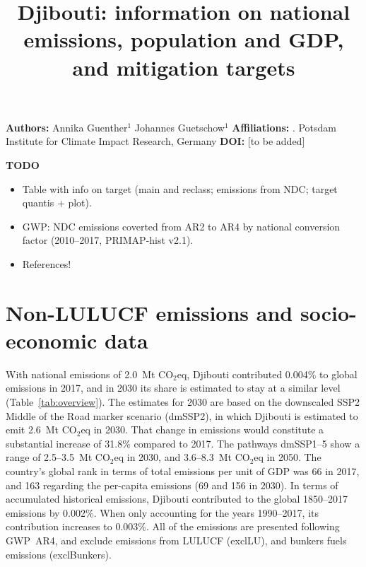 \documentclass[12pt]{article}
\title{ \bfseries \color{PIKorange} Djibouti: information on national emissions, population and GDP, and mitigation targets}
\begin{document}
 \maketitle

 \noindent \textbf{Authors:} \newline
 \indent Annika Guenther$^{1}$ \newline
 \indent Johannes Guetschow$^{1}$ \newline
 \noindent \textbf{Affiliations:} \newline
 . Potsdam Institute for Climate Impact Research, Germany \newline
 \noindent \textbf{DOI:} [to be added] \newline

 \textbf{TODO}
 \begin{itemize}
 \item Table with info on target (main and reclass; emissions from NDC; target quantis + plot).
 \item GWP: NDC emissions coverted from AR2 to AR4 by national conversion factor (2010--2017, PRIMAP-hist v2.1).
 \item References!
 \end{itemize}

 \newpage %
 \section{Non-LULUCF emissions and socio-economic data}
 \label{sec:nonLULUCFSocioEco}
 With national emissions of 2.0~Mt CO$_2$eq, Djibouti contributed 0.004\% to global emissions in 2017, and in 2030 its share is estimated to stay at a similar level (Table~\ref{tab:overview}).
 The estimates for 2030 are based on the downscaled SSP2 Middle of the Road marker scenario (dmSSP2), in which Djibouti is estimated to emit 2.6~Mt CO$_2$eq in 2030.
 That change in emissions would constitute a substantial increase of 31.8\% compared to 2017. 
 The pathways dmSSP1--5 show a range of 2.5--3.5~Mt CO$_2$eq in 2030, and 3.6--8.3~Mt CO$_2$eq in 2050.
 The country's global rank in terms of total emissions per unit of GDP was 66 in 2017, and 163 regarding the per-capita emissions (69 and 156 in 2030).
 In terms of accumulated historical emissions, Djibouti contributed to the global 1850--2017 emissions by 0.002\%. 
 When only accounting for the years 1990--2017, its contribution increases to 0.003\%.
 All of the emissions are presented following GWP~AR4, and exclude emissions from LULUCF (exclLU), and bunkers fuels emissions (exclBunkers).
\end{document}
